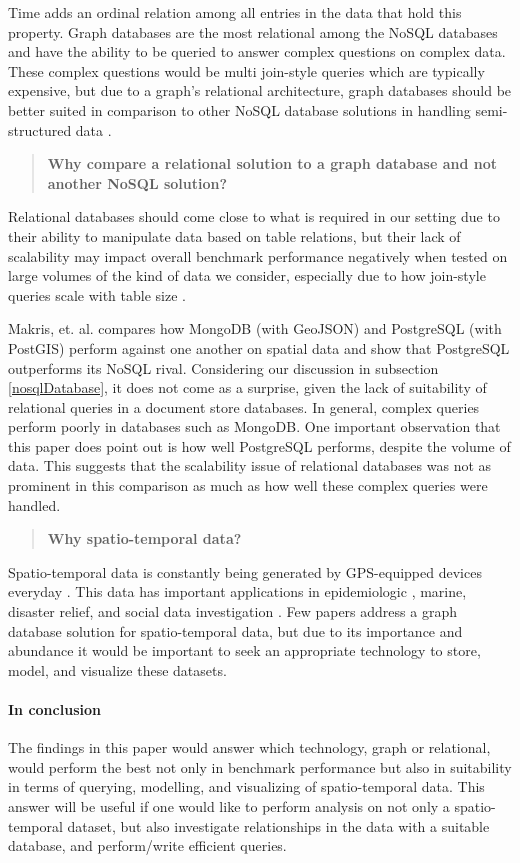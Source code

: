 Time adds an ordinal relation among all entries in the data that hold this property. Graph databases are the most relational among the NoSQL databases and have the ability to be queried to answer complex questions on complex data. These complex questions would be multi join-style queries which are typically expensive, but due to a graph's relational architecture, graph databases should be better suited in comparison to other NoSQL database solutions in handling semi-structured data \cite{dataInNosql}.

\begin{quote}
    \textbf{Why compare a relational solution to a graph database and not another NoSQL solution?}
\end{quote}

Relational databases should come close to what is required in our setting due to their ability to manipulate data based on table relations, but their lack of scalability may impact overall benchmark performance negatively when tested on large volumes of the kind of data we consider, especially due to how join-style queries scale with table size \cite{dataInNosql}.

Makris, et. al. \cite{mongoVsPostgres} compares how MongoDB (with GeoJSON) and PostgreSQL (with PostGIS) perform against one another on spatial data and show that PostgreSQL outperforms its NoSQL rival. Considering our discussion in subsection \ref{nosqlDatabase}, it does not come as a surprise, given the lack of suitability of relational queries in a document store databases. In general, complex queries perform poorly in databases such as MongoDB. One important observation that this paper does point out is how well PostgreSQL performs, despite the volume of data. This suggests that the scalability issue of relational databases was not as prominent in this comparison as much as how well these complex queries were handled.

\begin{quote}
    \textbf{Why spatio-temporal data?}
\end{quote}

Spatio-temporal data is constantly being generated by GPS-equipped devices everyday \cite{twitterData}\cite{clost}. This data has important applications in epidemiologic \cite{spatiotemporalEpidemiology}, marine, disaster relief, and social data investigation \cite{rao2012spatiotemporal}. Few papers address a graph database solution for spatio-temporal data, but due to its importance and abundance it would be important to seek an appropriate technology to store, model, and visualize these datasets.

\paragraph{In conclusion} The findings in this paper would answer which technology, graph or relational, would perform the best not only in benchmark performance but also in suitability in terms of querying, modelling, and visualizing of spatio-temporal data. This answer will be useful if one would like to perform analysis on not only a spatio-temporal dataset, but also investigate relationships in the data with a suitable database, and perform/write efficient queries.